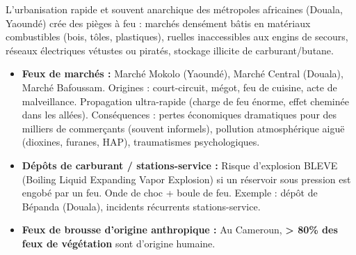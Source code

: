 \documentclass[11pt]{article}
\newcommand{\cle}[1]{{\popxbold\color{popdark}#1}}
\begin{document}
L'urbanisation rapide et souvent anarchique des métropoles africaines (Douala, Yaoundé) crée des \cle{pièges à feu} : marchés densément bâtis en matériaux combustibles (bois, tôles, plastiques), ruelles inaccessibles aux engins de secours, réseaux électriques vétustes ou piratés, stockage illicite de carburant/butane.

\begin{itemize}
    \item \textbf{Feux de marchés :} Marché Mokolo (Yaoundé), Marché Central (Douala), Marché Bafoussam. Origines : court-circuit, mégot, feu de cuisine, acte de malveillance. Propagation ultra-rapide (charge de feu énorme, effet cheminée dans les allées). Conséquences : pertes économiques dramatiques pour des milliers de commerçants (souvent informels), pollution atmosphérique aiguë (dioxines, furanes, HAP), traumatismes psychologiques.
    \item \textbf{Dépôts de carburant / stations-service :} Risque d'explosion BLEVE (Boiling Liquid Expanding Vapor Explosion) si un réservoir sous pression est engobé par un feu. Onde de choc + boule de feu. Exemple : dépôt de Bépanda (Douala), incidents récurrents stations-service.
    \item \textbf{Feux de brousse d'origine anthropique :} Au Cameroun, \textbf{> 80\% des feux de végétation} sont d'origine humaine.
\end{itemize}
\end{document}

